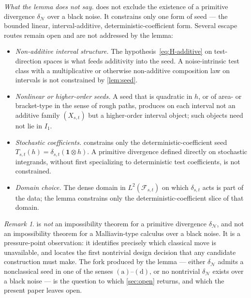 \documentclass[11pt,reqno]{amsart}
\theoremstyle{plain}
\theoremstyle{definition}
\theoremstyle{remark}
\newtheorem{remark}[theorem]{Remark}
\begin{document}
\medskip
\noindent\emph{What the lemma does not say.}
 does not exclude the existence of a primitive
divergence $\delta_{\mathcal N}$ over a black noise. It constrains
only one form of seed --- the bounded linear, interval-additive,
deterministic-coefficient form. Several escape routes remain open
and are not addressed by the lemma:
\begin{itemize}
\item[$(\mathrm a)$] \emph{Non-additive interval structure.} The
hypothesis~\eqref{eq:H-additive} on test-direction spaces is what
feeds additivity into the seed. A noise-intrinsic test class with a
multiplicative or otherwise non-additive composition law on
intervals is not constrained by \cref{lem:seed}.
\item[$(\mathrm b)$] \emph{Nonlinear or higher-order seeds.} A seed
that is quadratic in $h$, or of area- or bracket-type in the sense
of rough paths, produces on each interval not an additive family
$(X_{s,t})$ but a higher-order interval object; such objects need
not lie in $I_1$.
\item[$(\mathrm c)$] \emph{Stochastic coefficients.} 
constrains only the deterministic-coefficient seed
$T_{s,t}(h)=\delta_{s,t}(\mathbf 1\otimes h)$. A primitive divergence
defined directly on stochastic integrands, without first specializing
to deterministic test coefficients, is not constrained.
\item[$(\mathrm d)$] \emph{Domain choice.} The dense domain in
$L^2(\mathcal F_{s,t})$ on which $\delta_{s,t}$ acts is part of the
data; the lemma constrains only the deterministic-coefficient slice
of that domain.
\end{itemize}

\begin{remark}\label{rem:seed-interpretation}
 is \emph{not} an impossibility theorem for a
primitive divergence $\delta_{\mathcal N}$, and not an impossibility
theorem for a Malliavin-type calculus over a black noise. It is a
pressure-point observation: it identifies precisely which classical
move is unavailable, and locates the first nontrivial design
decision that any candidate construction must make. The fork
produced by the lemma --- either $\delta_{\mathcal N}$ admits a
nonclassical seed in one of the senses $(\mathrm a)$--$(\mathrm d)$,
or no nontrivial $\delta_{\mathcal N}$ exists over a black noise ---
is the question to which \cref{sec:open} returns, and which the
present paper leaves open.
\end{remark}
\end{document}
